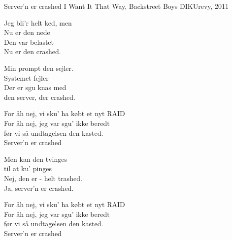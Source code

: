 \begin{song}{Server'n er crashed}
  {} %
  {I Want It That Way, Backstreet Boys} %
  {} %
  {DIKUrevy, 2011} %
  {\NotCCLIed} %

  \begin{SBVerse}
    Jeg bli'r helt ked, men\\
    Nu er den nede\\
    Den var belastet\\
    Nu er den crashed.
  \end{SBVerse}

  \begin{SBVerse}
    Min prompt den sejler.\\
    Systemet fejler\\
    Der er sgu knas med\\
    den server, der crashed.
  \end{SBVerse}

  \begin{SBChorus}
    For åh nej, vi sku' ha købt et nyt RAID\\
    For åh nej, jeg var sgu' ikke beredt\\
    før vi så undtagelsen den kasted.\\
    Server'n er crashed
  \end{SBChorus}

  \begin{SBVerse}
    Men kan den tvinges\\
    til at ku' pinges\\
    Nej, den er - helt trashed.\\
    Ja, server'n er crashed.
  \end{SBVerse}

  \begin{SBChorus}
    For åh nej, vi sku' ha købt et nyt RAID\\
    For åh nej, jeg var sgu' ikke beredt\\
    før vi så undtagelsen den kasted.\\
    Server'n er crashed
  \end{SBChorus}



\end{song}
